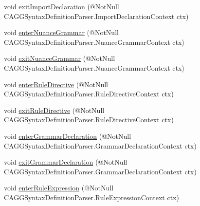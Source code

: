 \begin{DoxyCompactItemize}
\item 
void \hyperlink{classit_1_1emarolab_1_1cagg_1_1core_1_1language_1_1parser_1_1ANTLRInterface_1_1ANTLRGenerated_1_1a45b55289931e185944c10a916c8cdd_a9d8f1f725c6f33f984d4871d788c45d3}{exit\-Import\-Declaration} (@Not\-Null C\-A\-G\-G\-Syntax\-Definition\-Parser.\-Import\-Declaration\-Context ctx)
\item 
void \hyperlink{classit_1_1emarolab_1_1cagg_1_1core_1_1language_1_1parser_1_1ANTLRInterface_1_1ANTLRGenerated_1_1a45b55289931e185944c10a916c8cdd_a66636c7ac40196c57b27c0a42058331f}{enter\-Nuance\-Grammar} (@Not\-Null C\-A\-G\-G\-Syntax\-Definition\-Parser.\-Nuance\-Grammar\-Context ctx)
\item 
void \hyperlink{classit_1_1emarolab_1_1cagg_1_1core_1_1language_1_1parser_1_1ANTLRInterface_1_1ANTLRGenerated_1_1a45b55289931e185944c10a916c8cdd_afe3c03c356b7d570c5cd0506caa4c2ec}{exit\-Nuance\-Grammar} (@Not\-Null C\-A\-G\-G\-Syntax\-Definition\-Parser.\-Nuance\-Grammar\-Context ctx)
\item 
void \hyperlink{classit_1_1emarolab_1_1cagg_1_1core_1_1language_1_1parser_1_1ANTLRInterface_1_1ANTLRGenerated_1_1a45b55289931e185944c10a916c8cdd_af60c4a5a3d27a66196a093c11357d4dc}{enter\-Rule\-Directive} (@Not\-Null C\-A\-G\-G\-Syntax\-Definition\-Parser.\-Rule\-Directive\-Context ctx)
\item 
void \hyperlink{classit_1_1emarolab_1_1cagg_1_1core_1_1language_1_1parser_1_1ANTLRInterface_1_1ANTLRGenerated_1_1a45b55289931e185944c10a916c8cdd_a24f1765b0384839f58a9af1abf8c6c58}{exit\-Rule\-Directive} (@Not\-Null C\-A\-G\-G\-Syntax\-Definition\-Parser.\-Rule\-Directive\-Context ctx)
\item 
void \hyperlink{classit_1_1emarolab_1_1cagg_1_1core_1_1language_1_1parser_1_1ANTLRInterface_1_1ANTLRGenerated_1_1a45b55289931e185944c10a916c8cdd_ac86839aff18f9e1ab83225f227592fa0}{enter\-Grammar\-Declaration} (@Not\-Null C\-A\-G\-G\-Syntax\-Definition\-Parser.\-Grammar\-Declaration\-Context ctx)
\item 
void \hyperlink{classit_1_1emarolab_1_1cagg_1_1core_1_1language_1_1parser_1_1ANTLRInterface_1_1ANTLRGenerated_1_1a45b55289931e185944c10a916c8cdd_adc70aabcc8ced68d197376e72503566c}{exit\-Grammar\-Declaration} (@Not\-Null C\-A\-G\-G\-Syntax\-Definition\-Parser.\-Grammar\-Declaration\-Context ctx)
\item 
void \hyperlink{classit_1_1emarolab_1_1cagg_1_1core_1_1language_1_1parser_1_1ANTLRInterface_1_1ANTLRGenerated_1_1a45b55289931e185944c10a916c8cdd_aca763525f5c734101fe3c83b1dcc8ff9}{enter\-Rule\-Expression} (@Not\-Null C\-A\-G\-G\-Syntax\-Definition\-Parser.\-Rule\-Expression\-Context ctx)

\end{DoxyCompactItemize}
